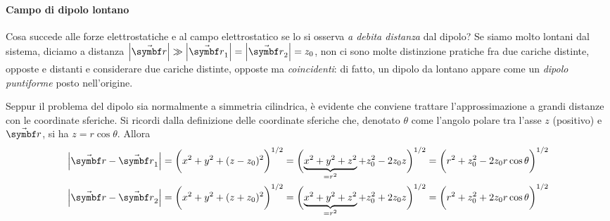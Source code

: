 \paragraph{Campo di dipolo lontano}
Cosa succede alle forze elettrostatiche e al campo elettrostatico se lo si osserva \textit{a debita distanza} dal dipolo? Se siamo molto lontani dal sistema, diciamo a distanza $\abs{\vba{r}}\gg\abs{\vba{r}_1}=\abs{\vba{r}_2}=z_0$, non ci sono molte distinzione pratiche fra due cariche distinte, opposte e distanti e considerare due cariche distinte, opposte ma \textit{coincidenti}: di fatto, un dipolo da lontano appare come un \textit{dipolo puntiforme} posto nell'origine.

Seppur il problema del dipolo sia normalmente a simmetria cilindrica, è evidente che conviene trattare l'approssimazione a grandi distanze con le coordinate sferiche.
Si ricordi dalla definizione delle coordinate sferiche che, denotato $\theta$ come l'angolo polare tra l'asse $z$ (positivo) e $\vba{r}$, si ha $z=r\cos\theta$. Allora %
\begin{gather*}
	\abs{\vba{r}-\vba{r}_1}=\biggl(x^2+y^2+(z-z_0)^2\biggr)^{1/2}=\biggl(\underbrace{x^2+y^2+z^2}_{=r^2}+z_0^2-2z_0z\biggr)^{1/2}=\biggl(r^2+z_0^2-2z_0r\cos\theta\biggr)^{1/2}\\
	\abs{\vba{r}-\vba{r}_2}=\biggl(x^2+y^2+(z+z_0)^2\biggr)^{1/2}=\biggl(\underbrace{x^2+y^2+z^2}_{=r^2}+z_0^2+2z_0z\biggr)^{1/2}=\biggl(r^2+z_0^2+2z_0r\cos\theta\biggr)^{1/2}
\end{gather*}
